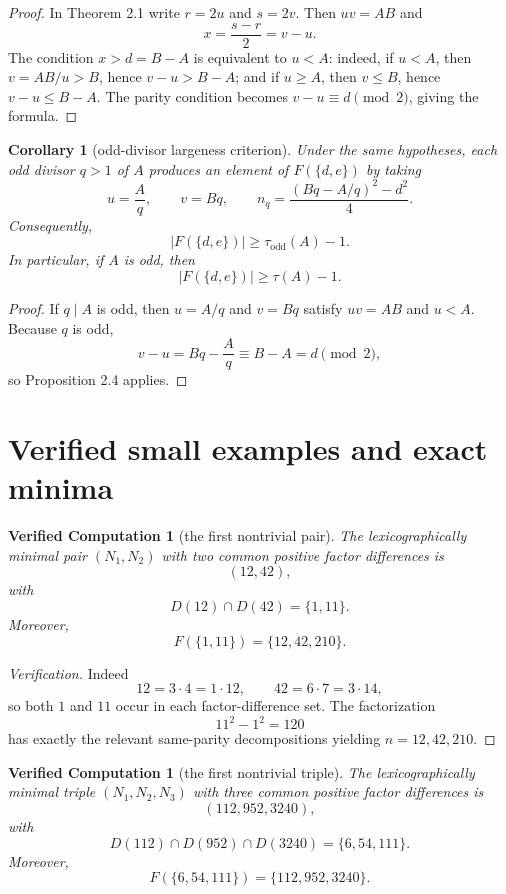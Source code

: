 \documentclass[11pt]{article}
\theoremstyle{plainbreak}
\newtheorem{corollary}[theorem]{Corollary}
\theoremstyle{defbreak}
\newtheorem{computation}[theorem]{Verified Computation}
\newcommand{\Dset}{D}
\newcommand{\Fset}{F}
\begin{document}
\begin{proof}
In Theorem 2.1 write $r=2u$ and $s=2v$. Then $uv=AB$ and
\[
x=\frac{s-r}{2}=v-u.
\]
The condition $x>d=B-A$ is equivalent to $u<A$: indeed, if $u<A$, then $v=AB/u>B$, hence $v-u>B-A$; and if $u\ge A$, then $v\le B$, hence $v-u\le B-A$. The parity condition becomes $v-u\equiv d\pmod 2$, giving the formula.
\end{proof}

\begin{corollary}[odd-divisor largeness criterion]
Under the same hypotheses, each odd divisor $q>1$ of $A$ produces an element of $\Fset(\{d,e\})$ by taking
\[
u=\frac{A}{q},\qquad v=Bq,\qquad
n_q=\frac{(Bq-A/q)^2-d^2}{4}.
\]
Consequently,
\[
|\Fset(\{d,e\})|\ge \tau_{\mathrm{odd}}(A)-1.
\]
In particular, if $A$ is odd, then
\[
|\Fset(\{d,e\})|\ge \tau(A)-1.
\]
\end{corollary}

\begin{proof}
If $q\mid A$ is odd, then $u=A/q$ and $v=Bq$ satisfy $uv=AB$ and $u<A$. Because $q$ is odd,
\[
v-u=Bq-\frac{A}{q}\equiv B-A=d\pmod 2,
\]
so Proposition 2.4 applies.
\end{proof}

\section{Verified small examples and exact minima}

\begin{computation}[the first nontrivial pair]
The lexicographically minimal pair $(N_1,N_2)$ with two common positive factor differences is
\[
(12,42),
\]
with
\[
\Dset(12)\cap \Dset(42)=\{1,11\}.
\]
Moreover,
\[
\Fset(\{1,11\})=\{12,42,210\}.
\]
\end{computation}

\begin{proof}[Verification]
Indeed
\[
12=3\cdot 4=1\cdot 12,\qquad 42=6\cdot 7=3\cdot 14,
\]
so both $1$ and $11$ occur in each factor-difference set.  The factorization
\[
11^2-1^2=120
\]
has exactly the relevant same-parity decompositions yielding $n=12,42,210$.
\end{proof}

\begin{computation}[the first nontrivial triple]
The lexicographically minimal triple $(N_1,N_2,N_3)$ with three common positive factor differences is
\[
(112,952,3240),
\]
with
\[
\Dset(112)\cap \Dset(952)\cap \Dset(3240)=\{6,54,111\}.
\]
Moreover,
\[
\Fset(\{6,54,111\})=\{112,952,3240\}.
\]
\end{computation}
\end{document}
